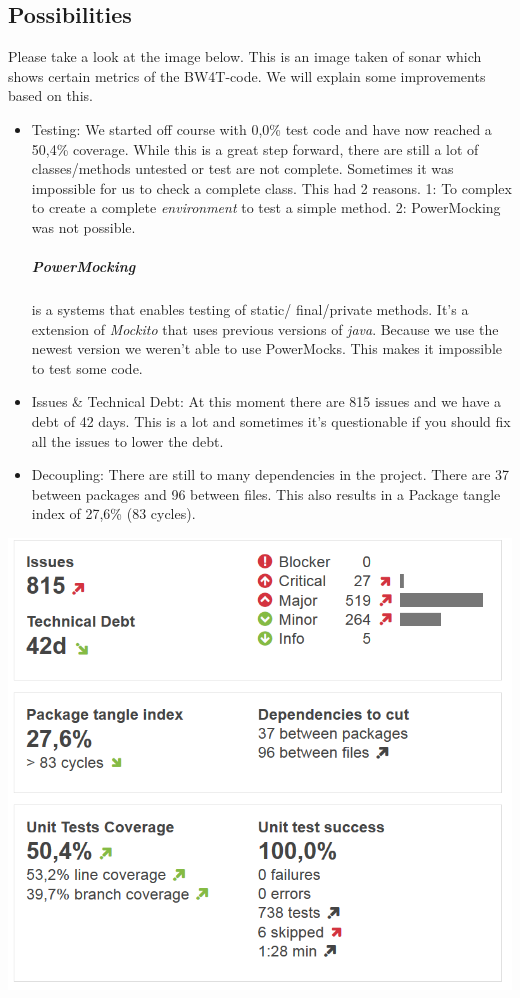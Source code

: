 \documentclass[]{article}
\begin{document}
\subsection{Possibilities}
Please take a look at the image below. This is an image taken of sonar which shows certain metrics of the BW4T-code. We will explain some improvements based on this. 
\begin{itemize}
	\item Testing: We started off course with 0,0\% test code and have now reached a 50,4\% coverage. While this is a great step forward, there are still a lot of classes/methods untested or test are not complete. Sometimes it was impossible for us to check a complete class. This had 2 reasons. 1: To complex to create a complete \emph{environment} to test a simple method. 2: PowerMocking was not possible.

\subparagraph*{PowerMocking}is a systems that enables testing of static/ final/private methods. It's a extension of \emph{Mockito} that uses previous versions of \emph{java}. Because we use the newest version we weren't able to use PowerMocks. This makes it impossible to test some code. 

	\item Issues \& Technical Debt: At this moment there are 815 issues and we have a debt of 42 days. This is a lot and sometimes it's questionable if you should fix all the issues to lower the debt. 
	
	\item Decoupling: There are still to many dependencies in the project. There are 37 between packages and 96 between files. This also results in a Package tangle index of	27,6\%  (83 cycles).  
	
\end{itemize}
\includegraphics[scale=0.5]{statistics_group1}
	
\end{document}
